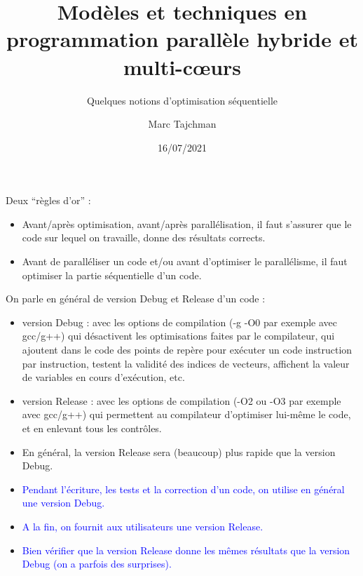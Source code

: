 \documentclass{beamer}
\title{Modèles et techniques en programmation parallèle hybride et multi-c\oe urs}
\subtitle{Quelques notions d'optimisation séquentielle}
\author{Marc Tajchman}\institute{CEA - DEN/DM2S/STMF/LMES}
\date{16/07/2021}
\begin{document}
\begin{frame}
\titlepage
\end{frame}

\large
\begin{frame}
	Deux ``règles d'or'' :
		\bigskip

	\begin{itemize}
		\item Avant/après optimisation, avant/après parallélisation, il faut s'assurer que le code sur lequel on travaille, donne des résultats corrects.
		\bigskip
		
		\item Avant de paralléliser un code et/ou avant d'optimiser le parallélisme, il faut optimiser la partie séquentielle d'un code.
	\end{itemize}

\end{frame}

\begin{frame}

On parle en général de version Debug et Release d'un code :
{\small
\begin{itemize}
	\item version Debug : avec les options de compilation (-g -O0 par exemple avec gcc/g++) qui désactivent les optimisations faites par le compilateur, qui ajoutent dans le code des points de repère pour exécuter un code instruction par instruction, testent la validité des indices de vecteurs, affichent la valeur de variables en cours d'exécution, etc.
	
	\item version Release : avec les options de compilation (-O2 ou -O3 par exemple avec gcc/g++) qui permettent au compilateur d'optimiser lui-même le code, et en enlevant tous les contrôles.
	
	\item En général, la version Release sera (beaucoup) plus rapide que la version Debug.
\end{itemize}
}
\vfill

\begin{itemize}
	\item[\textbullet] \textcolor{blue}{
		Pendant l'écriture, les tests et la correction d'un code, on utilise en général une version Debug. }
	\item[\textbullet] \textcolor{blue}{
		A la fin, on fournit aux utilisateurs une version Release.}
	\item[\textbullet] \textcolor{blue}{
		Bien vérifier que la version Release donne les mêmes résultats que la version Debug (on a parfois des surprises).}
\end{itemize}

\end{frame}
\end{document}
